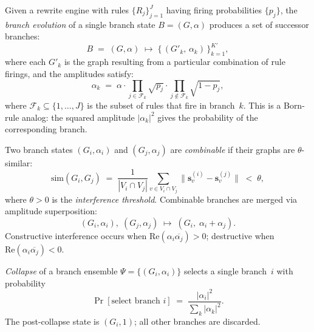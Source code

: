 \begin{definition}
\label{def:11.23}
Given a rewrite engine with rules $\{R_j\}_{j=1}^{J}$ having firing
probabilities $\{p_j\}$, the \emph{branch evolution} of a single
branch state $B = (G, \alpha)$ produces a set of successor branches:
\begin{equation}
\label{eq:11.branch_evolution}
  B \;=\; (G, \alpha)
  \;\longmapsto\;
  \bigl\{\, (G'_k,\, \alpha_k) \,\bigr\}_{k=1}^{K'},
\end{equation}
where each $G'_k$ is the graph resulting from a particular combination
of rule firings, and the amplitudes satisfy:
\begin{equation}
\label{eq:11.born_analog}
  \alpha_k \;=\;
  \alpha \cdot \prod_{j \in \mathcal{F}_k} \sqrt{p_j}
  \cdot \prod_{j \notin \mathcal{F}_k} \sqrt{1 - p_j},
\end{equation}
where $\mathcal{F}_k \subseteq \{1, \ldots, J\}$ is the subset of
rules that fire in branch~$k$.  This is a Born-rule analog: the
squared amplitude $|\alpha_k|^2$ gives the probability of the
corresponding branch.
\end{definition}

\begin{definition}[Interference]
\label{def:11.24}
Two branch states $(G_i, \alpha_i)$ and $(G_j, \alpha_j)$ are
\emph{combinable} if their graphs are $\theta$-similar:
\[
  \mathrm{sim}(G_i, G_j)
  \;=\;
  \frac{1}{|V_i \cap V_j|}
  \sum_{v \in V_i \cap V_j}
  \|\mathbf{s}_v^{(i)} - \mathbf{s}_v^{(j)}\|
  \;<\; \theta,
\]
where $\theta > 0$ is the \emph{interference threshold}.  Combinable
branches are merged via amplitude superposition:
\begin{equation}
\label{eq:11.interference}
  (G_i, \alpha_i),\; (G_j, \alpha_j)
  \;\longmapsto\;
  (G_i,\; \alpha_i + \alpha_j).
\end{equation}
Constructive interference occurs when $\mathrm{Re}(\alpha_i
\overline{\alpha_j}) > 0$; destructive when
$\mathrm{Re}(\alpha_i \overline{\alpha_j}) < 0$.
\end{definition}

\begin{definition}[Collapse]
\label{def:11.25}
\emph{Collapse} of a branch ensemble $\Psi = \{(G_i, \alpha_i)\}$
selects a single branch~$i$ with probability
\begin{equation}
\label{eq:11.collapse}
  \Pr[\text{select branch } i]
  \;=\;
  \frac{|\alpha_i|^2}{\sum_k |\alpha_k|^2}.
\end{equation}
The post-collapse state is $(G_i, 1)$; all other branches are
discarded.
\end{definition}

